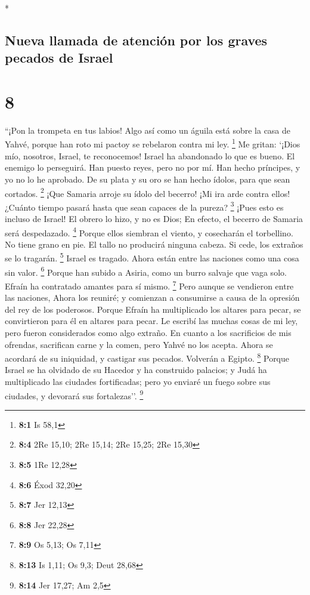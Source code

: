 \begin{paracol}{2}
\begin{otherlanguage}{english}
\end{otherlanguage}

\switchcolumn[0]*

\hypertarget{nueva-llamada-de-atenciuxf3n-por-los-graves-pecados-de-israel}{%
\subsection{Nueva llamada de atención por los graves pecados de
Israel}\label{nueva-llamada-de-atenciuxf3n-por-los-graves-pecados-de-israel}}

\hypertarget{section-14}{%
\section{8}\label{section-14}}

 ``¡Pon la trompeta en tus labios! Algo así como un águila
está sobre la casa de Yahvé, porque han roto mi pactoy se rebelaron
contra mi ley. \footnote{\textbf{8:1} Is 58,1}  Me gritan:
`¡Dios mío, nosotros, Israel, te reconocemos!  Israel ha
abandonado lo que es bueno. El enemigo lo perseguirá.  Han
puesto reyes, pero no por mí. Han hecho príncipes, y yo no lo he
aprobado. De su plata y su oro se han hecho ídolos, para que sean
cortados. \footnote{\textbf{8:4} 2Re 15,10; 2Re 15,14; 2Re 15,25; 2Re
  15,30}  ¡Que Samaria arroje su ídolo del becerro! ¡Mi
ira arde contra ellos! ¿Cuánto tiempo pasará hasta que sean capaces de
la pureza? \footnote{\textbf{8:5} 1Re 12,28}  ¡Pues esto
es incluso de Israel! El obrero lo hizo, y no es Dios; En efecto, el
becerro de Samaria será despedazado. \footnote{\textbf{8:6} Éxod 32,20}
 Porque ellos siembran el viento, y cosecharán el
torbellino. No tiene grano en pie. El tallo no producirá ninguna cabeza.
Si cede, los extraños se lo tragarán. \footnote{\textbf{8:7} Jer 12,13}
 Israel es tragado. Ahora están entre las naciones como
una cosa sin valor. \footnote{\textbf{8:8} Jer 22,28} 
Porque han subido a Asiria, como un burro salvaje que vaga solo. Efraín
ha contratado amantes para sí mismo. \footnote{\textbf{8:9} Os 5,13; Os
  7,11}  Pero aunque se vendieron entre las naciones,
Ahora los reuniré; y comienzan a consumirse a causa de la opresión del
rey de los poderosos.  Porque Efraín ha multiplicado los
altares para pecar, se convirtieron para él en altares para pecar.
 Le escribí las muchas cosas de mi ley, pero fueron
considerados como algo extraño.  En cuanto a los
sacrificios de mis ofrendas, sacrifican carne y la comen, pero Yahvé no
los acepta. Ahora se acordará de su iniquidad, y castigar sus pecados.
Volverán a Egipto. \footnote{\textbf{8:13} Is 1,11; Os 9,3; Deut 28,68}
 Porque Israel se ha olvidado de su Hacedor y ha
construido palacios; y Judá ha multiplicado las ciudades fortificadas;
pero yo enviaré un fuego sobre sus ciudades, y devorará sus
fortalezas''. \footnote{\textbf{8:14} Jer 17,27; Am 2,5}


\end{paracol}
